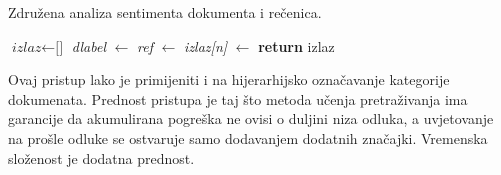 \begin{algorithm}
\caption{Združena analiza sentimenta dokumenta i rečenica.}
\label{alg:sentiment:docsent}
\begin{algorithmic}[1]
\State $\textit{izlaz} \gets \text{[]}$
\State \textit{dlabel} $\gets$ 
  \State \textit{ref} $\gets$ 
  \State \textit{izlaz[n]} $\gets$ 
\EndFor
\State {}
\State \textbf{return} izlaz
\EndFunction
\end{algorithmic}
\end{algorithm}

Ovaj pristup lako je primijeniti i na hijerarhijsko označavanje kategorije
dokumenata. Prednost pristupa je taj što metoda učenja pretraživanja ima
garancije da akumulirana pogreška ne ovisi o duljini niza odluka, a uvjetovanje
na prošle odluke se ostvaruje samo dodavanjem dodatnih značajki. Vremenska
složenost je dodatna prednost.

